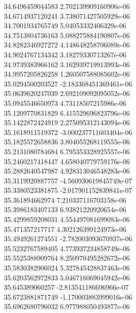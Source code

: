 {34.6496459044583 2.702139909160906e-06 \\
34.6714937120241 3.738071427505929e-06 \\
34.7001934765749 5.04053332406329e-06 \\
34.7513804736163 5.088275884190807e-06 \\
34.8282346927272 4.148648258706089e-06 \\
34.9024767134342 3.18279330713267e-06 \\
34.9739383966162 3.162939719913993e-06 \\
34.9957205826258 1.260507588085602e-06 \\
35.0294500203527 -2.183368451369461e-06 \\
35.0639620247039 2.692109092095052e-06 \\
35.0945546650973 4.73118507215986e-06 \\
35.1209770831829 6.415529696823796e-06 \\
35.1422872424919 2.275095312143094e-06 \\
35.1618911519372 -3.000237711603404e-06 \\
35.1825572658836 3.804055268119555e-06 \\
35.2131080784684 6.795353328925557e-06 \\
35.2460217418447 4.658040779759176e-06 \\
35.2882640547987 4.928313046548283e-06 \\
35.3119920887757 -4.560930619845749e-07 \\
35.3380523381875 -2.017901152839841e-07 \\
35.361894662974 7.210337116703158e-06 \\
35.3986183407133 6.93821220920654e-06 \\
35.4299859208031 4.554497081699083e-06 \\
35.471357217717 4.302126399124973e-06 \\
35.4949261274551 -2.782003093670937e-06 \\
35.5232767589405 4.773937234858749e-06 \\
35.5525388909764 8.250970495282672e-06 \\
35.5830382906024 5.327845428837463e-06 \\
35.6203562972833 5.046716069045942e-06 \\
35.645389060257 -2.813541186696966e-07 \\
35.6723881871749 -1.170003883999016e-06 \\
35.6962680796032 6.977988050493877e-06 \\
}
